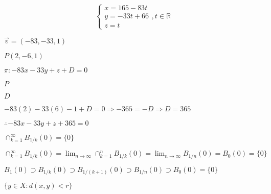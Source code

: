 \documentclass{article}
\def\lthtmlcheckvsize{\ifdim\ht\sizebox<\vsize 
  \ifdim\wd\sizebox<\hsize\expandafter\hfill\fi \expandafter\vfill
  \else\expandafter\vss\fi}%
\begin{document}
{\newpage\clearpage
{}%
\begin{displaymath}\begin{cases}
x=165-83t\\
y=-33t+66\\
z=t
\end{cases}, t\in\mathbb{R}\end{displaymath}%
\lthtmldisplayZ
\lthtmlcheckvsize\clearpage}

{\newpage\clearpage
{}%
$ \Vec{v}=(-83,-33,1)$%
\lthtmlindisplaymathZ
\lthtmlcheckvsize\clearpage}

{\newpage\clearpage
{}%
$ P(2,-6,1)$%
\lthtmlindisplaymathZ
\lthtmlcheckvsize\clearpage}

{\newpage\clearpage
{}%
$ \pi:-83x-33y+z+D=0$%
\lthtmlindisplaymathZ
\lthtmlcheckvsize\clearpage}

{\newpage\clearpage
{}%
$ P$%
\lthtmlindisplaymathZ
\lthtmlcheckvsize\clearpage}

{\newpage\clearpage
{}%
$ D$%
\lthtmlindisplaymathZ
\lthtmlcheckvsize\clearpage}

{\newpage\clearpage
{}%
$ -83(2)-33(6)-1+D=0\Rightarrow-365=-D\Rightarrow D=365$%
\lthtmlindisplaymathZ
\lthtmlcheckvsize\clearpage}

{\newpage\clearpage
{}%

$ \therefore -83x-33y+z+365=0$%
\lthtmlindisplaymathZ
\lthtmlcheckvsize\clearpage}

{\newpage\clearpage
{}%
$ \cap_{k=1}^{\infty} B_{1/k}(0) = \{0\}$%
\lthtmlindisplaymathZ
\lthtmlcheckvsize\clearpage}

{\newpage\clearpage
{}%
$\displaystyle \cap_{k=1}^{\infty} B_{1/k}(0) = \lim_{n \to \infty} \cap_{k=1}^{n} B_{1/k}(0) = \lim_{n \to \infty} B_{1/n}(0) = B_{0}(0) = \{0\} $%
\lthtmlindisplaymathZ
\lthtmlcheckvsize\clearpage}

{\newpage\clearpage
{}%
$ B_{1}(0) \supset B_{1/k}(0) \supset B_{1/(k+1)}(0) \supset B_{1/n}(0) \supset B_{0}(0) = \{0\} $%
\lthtmlindisplaymathZ
\lthtmlcheckvsize\clearpage}

{\newpage\clearpage
{}%
$ \{y \in X: d(x, y) < r \}$%
\lthtmlindisplaymathZ
\lthtmlcheckvsize\clearpage}
\end{document}
